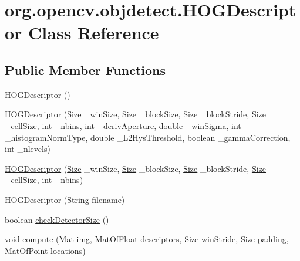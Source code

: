 \hypertarget{classorg_1_1opencv_1_1objdetect_1_1_h_o_g_descriptor}{}\section{org.\+opencv.\+objdetect.\+H\+O\+G\+Descriptor Class Reference}
\label{classorg_1_1opencv_1_1objdetect_1_1_h_o_g_descriptor}
\subsection*{Public Member Functions}
\begin{DoxyCompactItemize}
\item 
\mbox{\hyperlink{classorg_1_1opencv_1_1objdetect_1_1_h_o_g_descriptor_ad8383a5cefe566e302158f35fb4ee8df}{H\+O\+G\+Descriptor}} ()
\item 
\mbox{\hyperlink{classorg_1_1opencv_1_1objdetect_1_1_h_o_g_descriptor_a4589494b3db26bfd224ea8028171c335}{H\+O\+G\+Descriptor}} (\mbox{\hyperlink{classorg_1_1opencv_1_1core_1_1_size}{Size}} \+\_\+win\+Size, \mbox{\hyperlink{classorg_1_1opencv_1_1core_1_1_size}{Size}} \+\_\+block\+Size, \mbox{\hyperlink{classorg_1_1opencv_1_1core_1_1_size}{Size}} \+\_\+block\+Stride, \mbox{\hyperlink{classorg_1_1opencv_1_1core_1_1_size}{Size}} \+\_\+cell\+Size, int \+\_\+nbins, int \+\_\+deriv\+Aperture, double \+\_\+win\+Sigma, int \+\_\+histogram\+Norm\+Type, double \+\_\+\+L2\+Hys\+Threshold, boolean \+\_\+gamma\+Correction, int \+\_\+nlevels)
\item 
\mbox{\hyperlink{classorg_1_1opencv_1_1objdetect_1_1_h_o_g_descriptor_a9027ac957de8041e9bb9e5671c8d25ae}{H\+O\+G\+Descriptor}} (\mbox{\hyperlink{classorg_1_1opencv_1_1core_1_1_size}{Size}} \+\_\+win\+Size, \mbox{\hyperlink{classorg_1_1opencv_1_1core_1_1_size}{Size}} \+\_\+block\+Size, \mbox{\hyperlink{classorg_1_1opencv_1_1core_1_1_size}{Size}} \+\_\+block\+Stride, \mbox{\hyperlink{classorg_1_1opencv_1_1core_1_1_size}{Size}} \+\_\+cell\+Size, int \+\_\+nbins)
\item 
\mbox{\hyperlink{classorg_1_1opencv_1_1objdetect_1_1_h_o_g_descriptor_a0761b5d2d36b35ddd7135ea633475bf2}{H\+O\+G\+Descriptor}} (String filename)
\item 
boolean \mbox{\hyperlink{classorg_1_1opencv_1_1objdetect_1_1_h_o_g_descriptor_a6d9f493e4172ff68153f43f95aaabdba}{check\+Detector\+Size}} ()
\item 
void \mbox{\hyperlink{classorg_1_1opencv_1_1objdetect_1_1_h_o_g_descriptor_a2615b75d8e014bc7c751448c8b4fb653}{compute}} (\mbox{\hyperlink{classorg_1_1opencv_1_1core_1_1_mat}{Mat}} img, \mbox{\hyperlink{classorg_1_1opencv_1_1core_1_1_mat_of_float}{Mat\+Of\+Float}} descriptors, \mbox{\hyperlink{classorg_1_1opencv_1_1core_1_1_size}{Size}} win\+Stride, \mbox{\hyperlink{classorg_1_1opencv_1_1core_1_1_size}{Size}} padding, \mbox{\hyperlink{classorg_1_1opencv_1_1core_1_1_mat_of_point}{Mat\+Of\+Point}} locations)

\end{DoxyCompactItemize}
